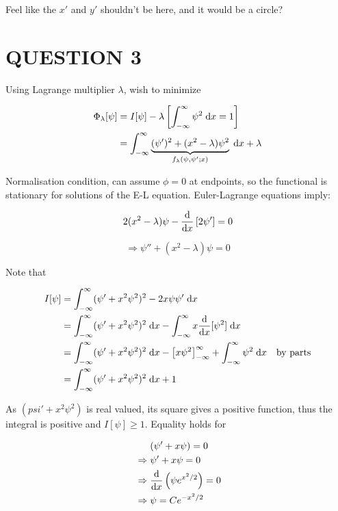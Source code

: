 \documentclass[a4paper]{article}
\begin{document}
Feel like the $ x' $ and $ y' $ shouldn't be here, and it would be a circle?





\section{QUESTION 3}

Using Lagrange multiplier $ \lambda $, wish to minimize


\begin{align*}
\Phi_{\lambda}[\psi] & = I[\psi] - \lambda  \left[    \int_{-\infty}^{\infty}  \psi^{2} \; \mathrm{d} x = 1  \right] \\
& = \int_{-\infty}^{\infty} \underbrace{(\psi')^{2} + (x^{2} - \lambda  ) \psi^{2} }_{f_{\lambda}(\psi,\psi' ; x)} \; \mathrm{d} x + \lambda
\end{align*}

Normalisation condition, can assume $ \phi = 0 $ at endpoints, so the functional is stationary for solutions of the E-L equation.
Euler-Lagrange equations imply:

\[ 2(x^{2} - \lambda) \psi - \frac{\mathrm{d} }{\mathrm{d} x} \left[  2 \psi' \right] = 0  \]

\[ \Rightarrow \psi'' + (x^{2} - \lambda) \psi = 0 \]

Note that

\begin{align*}
I[\psi]  & =  \int_{-\infty}^{\infty}  (\psi' + x^{2} \psi^{2} )^{2} - 2 x \psi \psi' \; \mathrm{d} x    \\
& =  \int_{-\infty}^{\infty}  (\psi' + x^{2} \psi^{2} )^{2} \; \mathrm{d} x  - \int_{-\infty}^{\infty}  x \frac{\mathrm{d} }{\mathrm{d} x}[\psi^{2}] \; \mathrm{d} x \\
& =  \int_{-\infty}^{\infty}  (\psi' + x^{2} \psi^{2} )^{2} \; \mathrm{d} x  - \left[     x \psi^{2} \right]_{-\infty}^{\infty} + \int_{-\infty}^{\infty} \psi^{2} \; \mathrm{d} x  \quad \text{by parts} \\
& =   \int_{-\infty}^{\infty}  (\psi' + x^{2} \psi^{2} )^{2} \; \mathrm{d} x + 1   \end{align*}

As $ (psi' + x^{2} \psi^{2}) $ is real valued, its square gives a positive function, thus the integral is positive and $ I[\psi] \geq 1 $. Equality holds for 

\begin{align*}
& \quad \; \; (\psi' + x \psi) = 0 \\
& \Rightarrow \psi'+ x \psi = 0 \\
& \Rightarrow \frac{\mathrm{d} }{\mathrm{d} x}  \left( \psi e^{x^{2}/2} \right) = 0 \\
& \Rightarrow \psi = C e^{- x^{2} / 2 }  
\end{align*}
\end{document}
